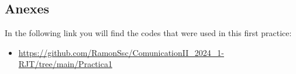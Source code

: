 \documentclass{journal}[IEEEtran, twocolumn]             %
\begin{document}
\begin{multicols}{2}
\section{Anexes}
In the following link you will find the codes that were used in this first practice: 
\begin{itemize}
    \item \url{https://github.com/RamonSsc/ComunicationII_2024_1-RJT/tree/main/Practica1}
\end{itemize}


\nocite{*}

\end{multicols}
\end{document}
